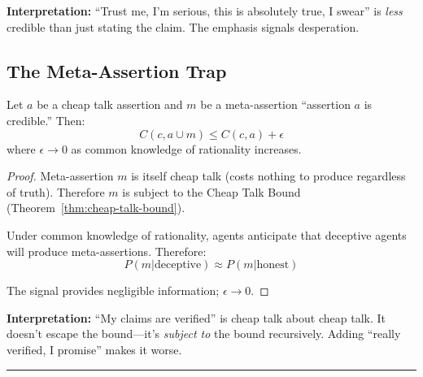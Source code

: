 \textbf{Interpretation:} ``Trust me, I'm serious, this is absolutely
true, I swear'' is \emph{less} credible than just stating the claim. The
emphasis signals desperation.

\subsection{The Meta-Assertion Trap}\label{the-meta-assertion-trap}

\begin{theorem}\label{thm:meta-assertion-trap}
Let \(a\) be a cheap talk assertion and \(m\) be a meta-assertion ``assertion \(a\) is credible.''
Then: \[C(c, a \cup m) \leq C(c, a) + \epsilon\]
where \(\epsilon \to 0\) as common knowledge of rationality increases.

  
\end{theorem}

\begin{proof}
Meta-assertion \(m\) is itself cheap talk (costs nothing to produce
regardless of truth). Therefore \(m\) is subject to the Cheap Talk Bound
(Theorem~\ref{thm:cheap-talk-bound}).

Under common knowledge of rationality, agents anticipate that deceptive
agents will produce meta-assertions. Therefore:
\[P(m | \text{deceptive}) \approx P(m | \text{honest})\]

The signal provides negligible information; \(\epsilon \to 0\).
\end{proof}

\textbf{Interpretation:} ``My claims are verified'' is cheap talk about
cheap talk. It doesn't escape the bound---it's \emph{subject to} the
bound recursively. Adding ``really verified, I promise'' makes it worse.

\begin{center}\rule{0.5\linewidth}{0.5pt}\end{center}

